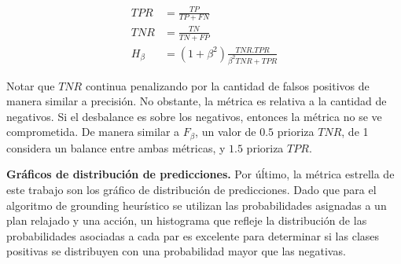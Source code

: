 \begin{align}
    TPR &= \frac{TP}{TP + FN} \\
    TNR &= \frac{TN}{TN + FP} \\
    H_{\beta} &= (1 + \beta^2) \frac{TNR . TPR}{\beta^2 TNR + TPR}
\end{align}

Notar que $TNR$ continua penalizando por la cantidad de falsos positivos de manera
similar a precisión. No obstante, la métrica es relativa a la cantidad de
negativos. Si el desbalance es sobre los negativos, entonces la métrica no se ve
comprometida. De manera similar a $F_{\beta}$, un valor de $0.5$ prioriza $TNR$, de
1 considera un balance entre ambas métricas, y $1.5$ prioriza $TPR$.

\textbf{Gráficos de distribución de predicciones.} Por úĺtimo, la métrica
estrella de este trabajo son los gráfico de distribución de predicciones. Dado
que para el algoritmo de grounding heurístico se utilizan las probabilidades
asignadas a un plan relajado y una acción, un histograma que refleje la
distribución de las probabilidades asociadas a cada par es excelente para
determinar si las clases positivas se distribuyen con una probabilidad mayor que
las negativas.